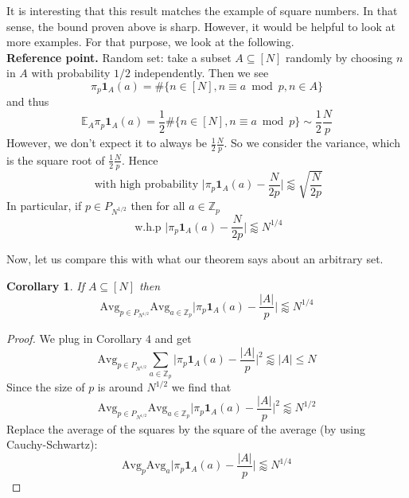 \documentclass[12pt]{amsart}
\newtheorem{Corollary}[theorem]{Corollary}
\newcommand{\ZZ}{\mathbb{Z}}
\begin{document}
It is interesting that this result matches the example of square numbers. In that sense, the bound proven above is sharp. However, it would be helpful to look at more examples. For that purpose, we look at the following. \\

\textbf{Reference point.} Random set: take a subset $A \subseteq [N]$ randomly by choosing $n$ in $A$ with probability $1/2$ independently. Then we see
\begin{equation*}
    \pi_p \mathbf{1}_A (a) = \# \{ n \in [N], n \equiv a \bmod p, n \in A  \}
\end{equation*}
and thus
\begin{equation*}
    \mathbb{E}_A \pi_p\mathbf{1}_A (a) = \frac{1}{2} \# \{ n \in [N], n \equiv a \bmod p \} \sim \frac{1}{2} \frac{N}{p}
\end{equation*}
However, we don't expect it to always be $\frac{1}{2}\frac{N}{p}$. So we consider the variance, which is the square root of $\frac{1}{2}\frac{N}{p}$. Hence
\begin{equation*}
    \text{ with high probability } \bigg| \pi_p \mathbf{1}_A(a) - \frac{N}{2p} \bigg| \lessapprox \sqrt{\frac{N}{2p}}
\end{equation*}
In particular, if $p \in P_{N^{1/2}}$ then for all $a \in \ZZ_p$
\begin{equation*}
    \text{ w.h.p } \bigg| \pi_p \mathbf{1}_A(a) - \frac{N}{2p} \bigg| \lessapprox N^{1/4}
\end{equation*}

Now, let us compare this with what our theorem says about an arbitrary set. 
\begin{Corollary}
    If $A \subseteq [N]$ then 
    \begin{equation*}
        \mathrm{Avg}_{p \in P_{N^{1/2}}} \mathrm{Avg}_{a \in \ZZ_p} \bigg| \pi_p \mathbf{1}_A(a) - \dfrac{|A|}{p} \bigg| \lessapprox N^{1/4}
    \end{equation*}
\end{Corollary}
\begin{proof}
    We plug in Corollary $4$ and get
    \begin{equation*}
        \mathrm{Avg}_{p \in P_{N^{1/2}}} \sum_{a \in \ZZ_p} \bigg| \pi_p \mathbf{1}_A(a) - \dfrac{|A|}{p} \bigg|^2 \lessapprox |A| \leq N
    \end{equation*}
    Since the size of $p$ is around $N^{1/2}$ we find that 
    \begin{equation*}
        \mathrm{Avg}_{p \in P_{N^{1/2}}} \mathrm{Avg}_{a \in \ZZ_p} \bigg| \pi_p \mathbf{1}_A(a) - \dfrac{|A|}{p} \bigg|^2 \lessapprox N^{1/2}
    \end{equation*}
    Replace the average of the squares by the square of the average (by using Cauchy-Schwartz):
    \begin{equation*}
        \mathrm{Avg}_p \mathrm{Avg}_a \bigg| \pi_p \mathbf{1}_A (a) - \dfrac{|A|}{p} \bigg| \lessapprox N^{1/4} 
    \end{equation*}
\end{proof}
\end{document}
